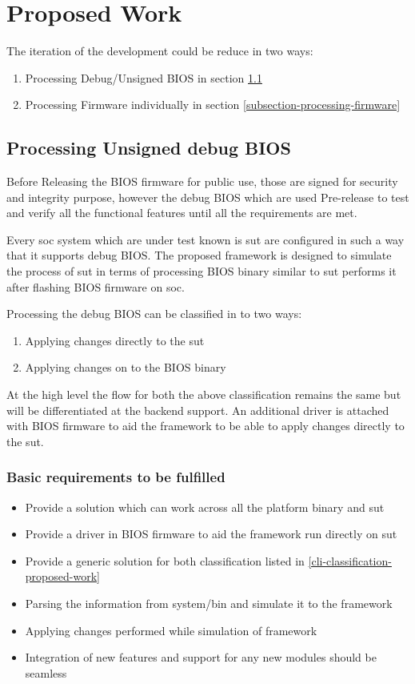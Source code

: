 \section{Proposed Work}\label{section-proposed-work}
The iteration of the development could be reduce in two ways:
\begin{enumerate}
    \item Processing Debug/Unsigned BIOS in section \ref{subsection-processing-bios}
    \item Processing Firmware individually in section \ref{subsection-processing-firmware}
\end{enumerate}

\subsection{Processing Unsigned debug BIOS}\label{subsection-processing-bios}
Before Releasing the BIOS firmware for public use, those are signed for security and integrity purpose, however the debug BIOS which are used Pre-release to test and verify all the functional features until all the requirements are met.

Every \gls{soc} system which are under test known is \gls{sut} are configured in such a way that it supports debug BIOS. The proposed framework is designed to simulate the process of \gls{sut} in terms of processing BIOS binary similar to \gls{sut} performs it after flashing BIOS firmware on \gls{soc}. 


Processing the debug BIOS can be classified in to two ways:
\begin{enumerate}\label{cli-classification-proposed-work}
	\item Applying changes directly to the \gls{sut}
	\item Applying changes on to the BIOS binary
\end{enumerate}

At the high level the flow for both the above classification remains the same but will be differentiated at the backend support. An additional driver is attached with BIOS firmware to aid the framework to be able to apply changes directly to the \gls{sut}.


\subsubsection{Basic requirements to be fulfilled}
\begin{itemize}
	\item Provide a solution which can work across all the platform binary and \gls{sut}
	\item Provide a driver in BIOS firmware to aid the framework run directly on \gls{sut}
	\item Provide a generic solution for both classification listed in \ref{cli-classification-proposed-work}
	\item Parsing the information from system/bin and simulate it to the framework
	\item Applying changes performed while simulation of framework
	\item Integration of new features and support for any new modules should be seamless
\end{itemize}

